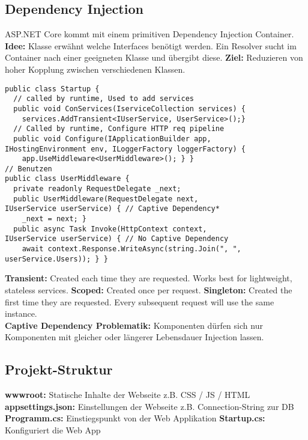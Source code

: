 \subsection{Dependency Injection}
ASP.NET Core kommt mit einem primitiven Dependency Injection Container. \textbf{Idee:} Klasse erwähnt welche Interfaces benötigt werden. Ein Resolver sucht im Container nach einer geeigneten Klasse und übergibt diese. \textbf{Ziel:} Reduzieren von hoher Kopplung zwischen verschiedenen Klassen.
\begin{lstlisting}[style=csh]
public class Startup {
  // called by runtime, Used to add services
  public void ConServices(IserviceCollection services) {
    services.AddTransient<IUserService, UserService>();}
  // Called by runtime, Configure HTTP req pipeline
  public void Configure(IApplicationBuilder app,
IHostingEnvironment env, ILoggerFactory loggerFactory) {
    app.UseMiddleware<UserMiddleware>(); } }
// Benutzen
public class UserMiddleware {
  private readonly RequestDelegate _next;
  public UserMiddleware(RequestDelegate next,
IUserService userService) { // Captive Dependency*
    _next = next; }
  public async Task Invoke(HttpContext context,
IUserService userService) { // No Captive Dependency
    await context.Response.WriteAsync(string.Join(", ", userService.Users)); } }
\end{lstlisting}
\textcolor{b}{\textbf{Transient:}} Created each time they are requested. Works best for lightweight, stateless services. \textcolor{b}{\textbf{Scoped:}} Created once per request. \textcolor{b}{\textbf{Singleton:}} Created the first time they are requested. Every subsequent request will use the same instance.\\
\textcolor{b}{\textbf{Captive Dependency Problematik:}} Komponenten dürfen sich nur Komponenten mit gleicher oder längerer Lebensdauer Injection lassen.
\subsection{Projekt-Struktur}
\textcolor{b}{\textbf{wwwroot:}} Statische Inhalte der Webseite z.B. CSS / JS / HTML
\textcolor{b}{\textbf{appsettings.json:}} Einstellungen der Webseite z.B. Connection-String zur DB
\textcolor{b}{\textbf{Programm.cs:}} Einstiegspunkt von der Web Applikation
\textcolor{b}{\textbf{Startup.cs:}} Konfiguriert die Web App
